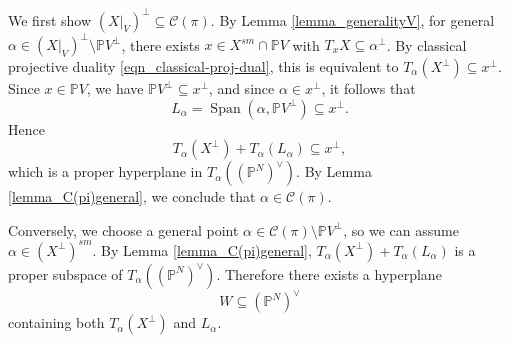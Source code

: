 \documentclass[12pt]{amsart}
\begin{document}
We first show $\left(X\vert_V\right)^{\perp}\subseteq\mathcal{C} (\pi)$. By Lemma \ref{lemma_generalityV}, for general $\alpha\in\left(X\vert_V\right)^{\perp}\setminus \mathbb PV^\perp$, there exists $x\in X^{sm}\cap \mathbb PV$ with $T_xX\subseteq\alpha^{\perp}$. By classical projective duality \eqref{eqn_classical-proj-dual}, this is equivalent to $T_{\alpha}\left(X^{\perp}\right)\subseteq x^{\perp}$. Since $x\in \mathbb PV$, we have $\mathbb PV^\perp\subseteq x^\perp$, and since
$\alpha\in x^\perp$, it follows that
\[
L_\alpha=\operatorname{Span}(\alpha,\mathbb PV^\perp)\subseteq x^\perp.
\]
Hence
\[
T_\alpha(X^\perp)+T_\alpha(L_\alpha)\subseteq x^\perp,
\]
which is a proper hyperplane in $T_\alpha((\mathbb P^N)^\vee)$.
By Lemma \ref{lemma_C(pi)general}, we conclude that
$\alpha\in \mathcal C(\pi)$.%


Conversely, we choose a general point $\alpha\in\mathcal{C}(\pi)\setminus \mathbb PV^\perp$, so we can assume $\alpha\in (X^{\perp})^{sm}$. By Lemma \ref{lemma_C(pi)general}, $T_\alpha(X^\perp)+T_\alpha(L_\alpha)$ is a proper subspace of $T_\alpha((\mathbb P^N)^\vee)$.
Therefore there exists a hyperplane
\[
W\subseteq (\mathbb P^N)^\vee
\]
containing both $T_\alpha(X^\perp)$ and $L_\alpha$.%
\end{document}
